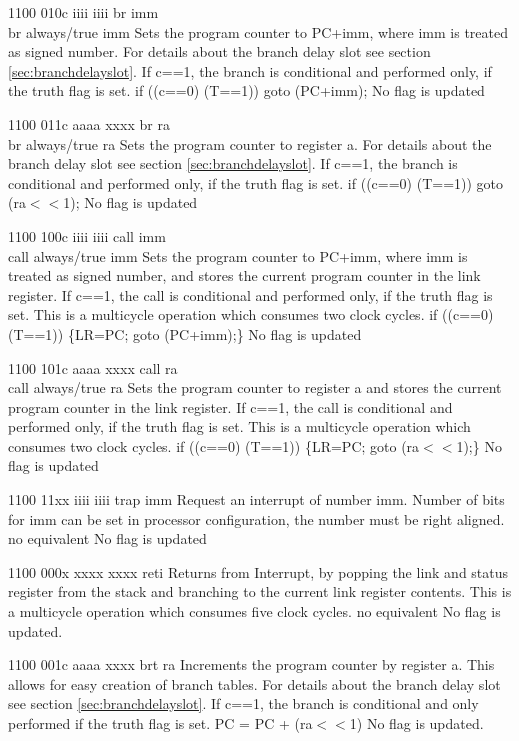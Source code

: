	{1100 010c iiii iiii}
	{br imm\\br always/true imm}
	{Sets the program counter to PC+imm, where imm is treated as signed number. For details about the branch delay slot see section \ref{sec:branchdelayslot}. If c==1, the branch is conditional and performed only, if the truth flag is set.}
	{if ((c==0) \logicor (T==1)) goto (PC+imm);}
	{No flag is updated}

	{1100 011c aaaa xxxx}
	{br ra\\br always/true ra}
	{Sets the program counter to register a. For details about the branch delay slot see section \ref{sec:branchdelayslot}. If c==1, the branch is conditional and performed only, if the truth flag is set.}
	{if ((c==0) \logicor (T==1)) goto (ra$<<$1);}
	{No flag is updated}
	
	{1100 100c iiii iiii}
	{call imm\\call always/true imm}
	{Sets the program counter to PC+imm, where imm is treated as signed number, and stores the current program counter in the link register. If c==1, the call is conditional and performed only, if the truth flag is set. This is a multicycle operation which consumes two clock cycles.}
	{if ((c==0) \logicor (T==1)) \{LR=PC; goto (PC+imm);\}}
	{No flag is updated}
	
	{1100 101c aaaa xxxx}
	{call ra\\call always/true ra}
	{Sets the program counter to register a and stores the current program counter in the link register. If c==1, the call is conditional and performed only, if the truth flag is set. This is a multicycle operation which consumes two clock cycles.}
	{if ((c==0) \logicor (T==1)) \{LR=PC; goto (ra$<<$1);\}}
	{No flag is updated}

	{1100 11xx iiii iiii}
	{trap imm}
	{Request an interrupt of number imm. Number of bits for imm can be set in processor configuration, the number must be right aligned.}
	{no equivalent}
	{No flag is updated}

	{1100 000x xxxx xxxx}
	{reti}
	{Returns from Interrupt, by popping the link and status register from the stack and branching to the current link register contents. This is a multicycle operation which consumes five clock cycles.}
	{no equivalent}
	{No flag is updated.}

	{1100 001c aaaa xxxx}
	{brt ra}
	{Increments the program counter by register a. This allows for easy creation of branch tables. For details about the branch delay slot see section \ref{sec:branchdelayslot}. If c==1, the branch is conditional and only performed if the truth flag is set.}
	{PC = PC + (ra$<<$1)}
	{No flag is updated.}

